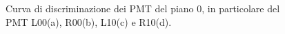 \begin{figure}[H]
\begin{minipage}{.5\textwidth}
	\end{minipage}%
	\begin{minipage}{.5\textwidth}
		\centering
		\quad
	\end{minipage}
  \caption{Curva di discriminazione dei PMT del piano 0, in particolare del PMT L00(a), R00(b), L10(c) e R10(d).}
\end{figure}

